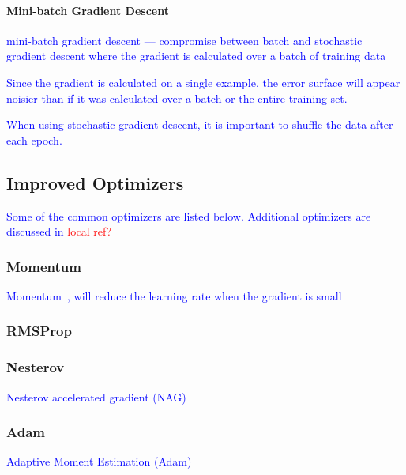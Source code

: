 \paragraph{Mini-batch Gradient Descent}

\textcolor{blue}{mini-batch gradient descent --- compromise between batch and stochastic gradient descent where the gradient is calculated over a batch of training data}

\textcolor{blue}{Since the gradient is calculated on a single example, the error surface will appear noisier than if it was calculated over a batch or the entire training set.}

\textcolor{blue}{When using stochastic gradient descent, it is important to shuffle the data after each epoch.}



\subsection{Improved Optimizers}

\textcolor{blue}{Some of the common optimizers are listed below. Additional optimizers are discussed in \textcolor{red}{local ref?}}

\subsubsection{Momentum}

\textcolor{blue}{Momentum~\cite{qian1999momentum}, will reduce the learning rate when the gradient is small}

\subsubsection{RMSProp}

\subsubsection{Nesterov}

\textcolor{blue}{Nesterov accelerated gradient (NAG)}

\subsubsection{Adam}

\textcolor{blue}{Adaptive Moment Estimation (Adam)~\cite{kingma2014adam}}


